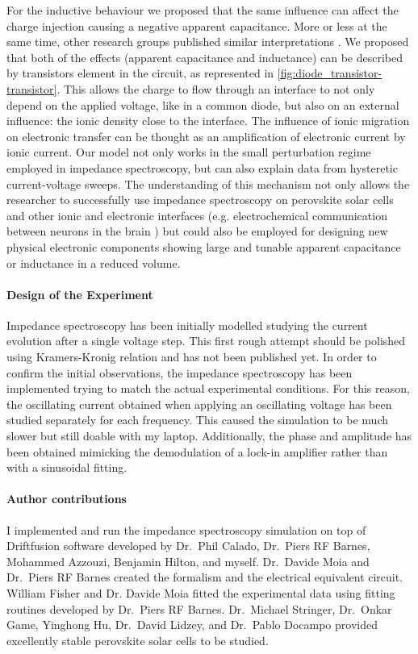 	For the inductive behaviour we proposed that the same influence can affect the charge injection causing a negative apparent capacitance.
	More or less at the same time, other research groups published similar interpretations \cite{Ebadi2019,Jacobs2018}.
	We proposed that both of the effects (apparent capacitance and inductance) can be described by transistors element in the circuit, as represented in \cref{fig:diode_transistor-transistor}.
	This allows the charge to flow through an interface to not only depend on the applied voltage, like in a common diode, but also on an external influence: the ionic density close to the interface.
	The influence of ionic migration on electronic transfer can be thought as an amplification of electronic current by ionic current.
	Our model not only works in the small perturbation regime employed in impedance spectroscopy, but can also explain data from hysteretic current\hyp{}voltage sweeps.
	The understanding of this mechanism not only allows the researcher to successfully use impedance spectroscopy on perovskite solar cells and other ionic and electronic interfaces (e.g. electrochemical communication between neurons in the brain \cite{Cole1956}) but could also be employed for designing new physical electronic components showing large and tunable apparent capacitance or inductance in a reduced volume.

	\paragraph{Design of the Experiment}
	Impedance spectroscopy has been initially modelled studying the current evolution after a single voltage step.
	This first rough attempt should be polished using Kramers\hyp{}Kronig relation and has not been published yet.
	In order to confirm the initial observations, the impedance spectroscopy has been implemented trying to match the actual experimental conditions.
	For this reason, the oscillating current obtained when applying an oscillating voltage has been studied separately for each frequency.
	This caused the simulation to be much slower but still doable with my laptop.
	Additionally, the phase and amplitude has been obtained mimicking the demodulation of a lock-in amplifier rather than with a sinusoidal fitting.

	\paragraph{Author contributions}
	I implemented and run the impedance spectroscopy simulation on top of Driftfusion software developed by Dr.\ Phil Calado, Dr.\ Piers RF Barnes, Mohammed Azzouzi, Benjamin Hilton, and myself.
	Dr.\ Davide Moia and Dr.\ Piers RF Barnes created the formalism and the electrical equivalent circuit.
	William Fisher and Dr. Davide Moia fitted the experimental data using fitting routines developed by Dr.\ Piers RF Barnes.
	Dr.\ Michael Stringer, Dr.\ Onkar Game, Yinghong Hu, Dr.\ David Lidzey, and Dr.\ Pablo Docampo provided excellently stable perovskite solar cells to be studied.

